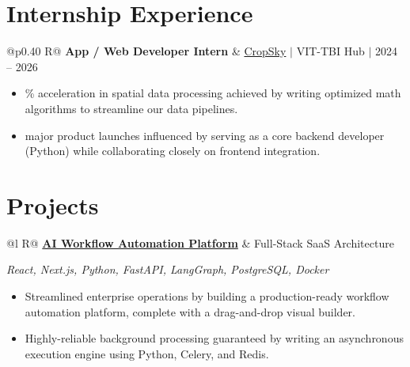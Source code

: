 \documentclass[a4paper,10pt]{article}
\newcommand{\ulink}[2]{\href{#1}{#2}}
\newcommand{\subheading}[1]{{\color[HTML]{0A0A0A}\fontsize{12}{14}\selectfont\bfseries #1}}
\newcommand{\techstack}[1]{{\color[HTML]{5C5C5C}\fontsize{10.5}{12.5}\selectfont\itshape #1}}
\newcommand{\meta}[1]{{\color[HTML]{5C5C5C}\fontsize{10.5}{12.5}\selectfont #1}}
\begin{document}
\section{Internship Experience}
\vspace{2pt}

\begin{tabularx}{\linewidth}{@{}p{0.40\linewidth} R@{}}
\subheading{App / Web Developer Intern} & \meta{\ulink{https://sites.google.com/view/cropsky/home}{CropSky} $|$ VIT-TBI Hub $|$ 2024 -- 2026}
\end{tabularx}
\begin{itemize}[nosep, leftmargin=1.5em, itemsep=2pt, topsep=2pt]
  \item {\color[HTML]{0A0A0A}\fontsize{11}{14}\% acceleration in spatial data processing achieved by writing optimized math algorithms to streamline our data pipelines.}
  \item {\color[HTML]{0A0A0A}\fontsize{11}{14} major product launches influenced by serving as a core backend developer (Python) while collaborating closely on frontend integration.}
\end{itemize}

\section{Projects}
\vspace{2pt}

\begin{tabularx}{\linewidth}{@{}l R@{}}
\subheading{\ulink{https://github.com/su-jin1425/AI-Workflow-Automation-Platform}{AI Workflow Automation Platform}} & \meta{Full-Stack SaaS Architecture}
\end{tabularx}
\techstack{React, Next.js, Python, FastAPI, LangGraph, PostgreSQL, Docker}
\begin{itemize}[nosep, leftmargin=1.5em, itemsep=2pt, topsep=2pt]
  \item {\color[HTML]{0A0A0A}\fontsize{11}{14}\selectfont Streamlined enterprise operations by building a production-ready workflow automation platform, complete with a drag-and-drop visual builder.}
  \item {\color[HTML]{0A0A0A}\fontsize{11}{14}\selectfont Highly-reliable background processing guaranteed by writing an asynchronous execution engine using Python, Celery, and Redis.}
\end{itemize}
\end{document}
